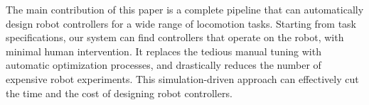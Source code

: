 The main contribution of this paper is a complete pipeline that can automatically design robot controllers for a wide range of locomotion tasks. Starting from task specifications, our system can find controllers that operate on the robot, with minimal human intervention. It replaces the tedious manual tuning with automatic optimization processes, and drastically reduces the number of expensive robot experiments. This simulation-driven approach can effectively cut the time and the cost of designing robot controllers.
